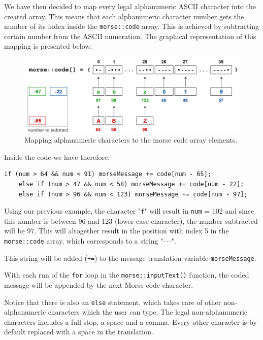 \documentclass[10pt]{report}
\begin{document}
We have then decided to map every legal alphanumeric ASCII character into the created array. This means that each alphanumeric character number gets the number of its index inside the \verb|morse::code| array. This is achieved by subtracting certain number from the ASCII numeration. The graphical representation of this mapping is presented below:

\begin{figure}[H]
\centering\includegraphics[scale=0.1]{morse_code_map}
\caption{Mapping alphanumeric characters to the morse code array elements.}				
\label{fig:morse_code_map}
\end{figure}

Inside the code we have therefore:

\begin{lstlisting}
if (num > 64 && num < 91) morseMessage += code[num - 65];
	else if (num > 47 && num < 58) morseMessage += code[num - 22];
	else if (num > 96 && num < 123) morseMessage += code[num - 97];
\end{lstlisting}

Using our previous example, the character "\verb|f|" will result in \verb|num| = 102 and since this number is between 96 and 123 (lower-case character), the number subtracted will be 97. This will altogether result in the position with index 5 in the \verb|morse::code| array, which corresponds to a string "$\cdot\cdot$\text{-}$\cdot$". 

This string will be added (\verb|+=|) to the message translation variable \verb|morseMessage|.

With each run of the \verb|for| loop in the \verb|morse::inputText()| function, the coded message will be appended by the next Morse code character.

Notice that there is also an \verb|else| statement, which takes care of other non-alphanumeric characters which the user can type. The legal non-alphanumeric characters includes a full stop, a space and a comma. Every other character is by default replaced with a space in the translation.
\end{document}
